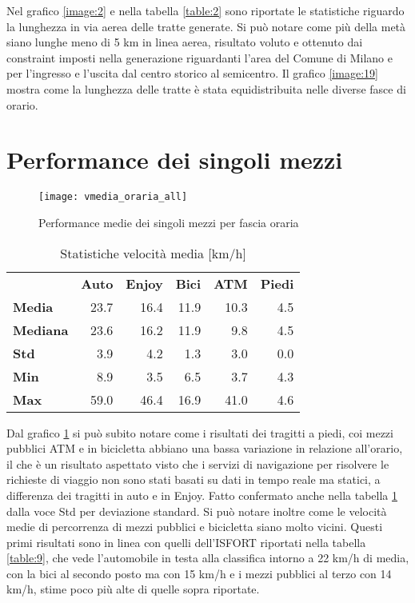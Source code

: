 Nel grafico \ref{image:2} e nella tabella \ref{table:2} sono riportate le statistiche riguardo la lunghezza in via aerea delle tratte generate. Si può notare come più della metà siano lunghe meno di 5 km in linea aerea, risultato voluto e ottenuto dai constraint imposti nella generazione riguardanti l'area del Comune di Milano e per l'ingresso e l'uscita dal centro storico al semicentro. Il grafico \ref{image:19} mostra come la lunghezza delle tratte è stata equidistribuita nelle diverse fasce di orario.

\section{Performance dei singoli mezzi}

\begin{figure}[H]
\texttt{[image: vmedia\_oraria\_all]}
\caption{Performance medie dei singoli mezzi per fascia oraria}
\label{image:15}
\end{figure}

\begin{table}[H]
\centering
\begin{tabular}{ | l r r r r r | }
\hline
& \textbf{Auto} & \textbf{Enjoy} & \textbf{Bici} & \textbf{ATM} & \textbf{Piedi} \\
\textbf{Media}      & 23.7 & 16.4 & 11.9 & 10.3 & 4.5 \\
\textbf{Mediana} & 23.6 & 16.2 & 11.9 &   9.8 & 4.5 \\
\textbf{Std}             &  3.9 &   4.2 &   1.3 &    3.0 & 0.0 \\
\textbf{Min}            &  8.9 &   3.5 &   6.5 &    3.7 & 4.3 \\
\textbf{Max}         & 59.0 & 46.4 & 16.9 &  41.0 & 4.6 \\
\hline
\end{tabular}
\caption{Statistiche velocità media [km/h]}
\label{table:3}
\end{table}

Dal grafico \ref{image:15} si può subito notare come i risultati dei tragitti a piedi, coi mezzi pubblici ATM e in bicicletta abbiano una bassa variazione in relazione all'orario, il che è un risultato aspettato visto che i servizi di navigazione per risolvere le richieste di viaggio non sono stati basati su dati in tempo reale ma statici, a differenza dei tragitti in auto e in Enjoy. Fatto confermato anche nella tabella \ref{table:3} dalla voce Std per deviazione standard. Si può notare inoltre come le velocità medie di percorrenza di mezzi pubblici e bicicletta siano molto vicini. Questi primi risultati sono in linea con quelli dell'ISFORT riportati nella tabella \ref{table:9}, che vede l'automobile in testa alla classifica intorno a 22 km/h di media, con la bici al secondo posto ma con 15 km/h e i mezzi pubblici al terzo con 14 km/h, stime poco più alte di quelle sopra riportate.

